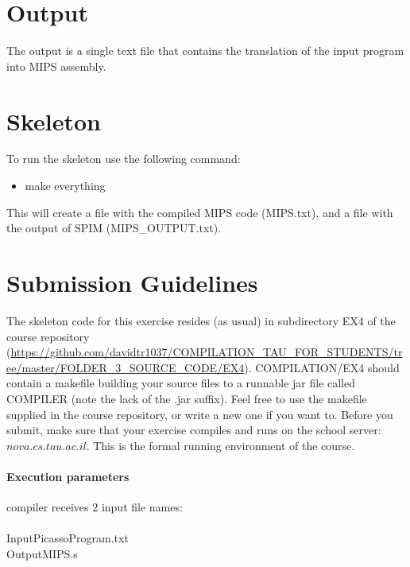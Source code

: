 \documentclass{article}
\begin{document}
\section{Output}
The output is a single text file that contains the
translation of the input program into MIPS assembly.

\section{Skeleton}
To run the skeleton use the following command:
\begin{itemize}
\item make everything
\end{itemize}
This will create a file with the compiled MIPS code (MIPS.txt), and a file with the output of SPIM (MIPS\_OUTPUT.txt).

\section{Submission Guidelines}
The skeleton code for this exercise resides (as usual)
in subdirectory EX4 of the course repository
(\url{https://github.com/davidtr1037/COMPILATION_TAU_FOR_STUDENTS/tree/master/FOLDER_3_SOURCE_CODE/EX4}).
COMPILATION/EX4 should contain a makefile building your source files to a
runnable jar file called COMPILER (note the lack of the .jar suffix).
Feel free to use the makefile supplied in the course repository,
or write a new one if you want to. 
Before you submit, make sure that your exercise compiles and runs
on the school server: $nova.cs.tau.ac.il$.
This is the formal running environment of the course.

\paragraph{Execution parameters}
compiler receives $2$ input file names:\\ \\
InputPicassoProgram.txt\\
OutputMIPS.s
\end{document}

